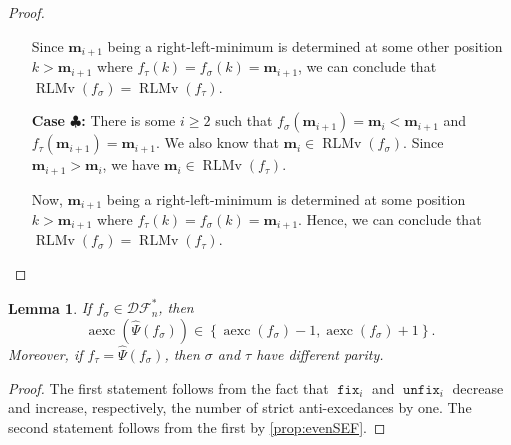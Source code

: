 \documentclass[reqno]{amsart}
\newtheorem{lemma}[theorem]{Lemma}
\theoremstyle{definition}
\newcommand{\DSEF}{\mathcal{DF}}%
\newcommand{\fretherD}{\hat{\Psi}}
\newcommand{\caseFour}{\ensuremath{\clubsuit}}
\newcommand{\img}{\mathbf{m}}
\DeclareMathOperator{\RLMv}{RLMv}
\DeclareMathOperator{\aexc}{aexc} %
\DeclareMathOperator{\fixMap}{\mathtt{fix}}
\DeclareMathOperator{\unfixMap}{\mathtt{unfix}}
\begin{document}
\begin{proof}
\begin{enumerate}[leftmargin=2cm]
	Since $\img_{i+1}$ being a right-left-minimum is determined at some other
	position $k>\img_{i+1}$ where $f_\tau(k)=f_\sigma(k)=\img_{i+1}$,
	we can conclude that $\RLMv(f_\sigma)=\RLMv(f_\tau)$.
	
	\item[\textbf{Case \caseFour:}]
	There is some $i\geq 2$ such that $f_\sigma(\img_{i+1})=\img_i<\img_{i+1}$
	and $f_\tau(\img_{i+1})=\img_{i+1}$.
	We also know that $\img_i\in\RLMv(f_\sigma)$. 
	Since $\img_{i+1}>\img_i$, we have $\img_i\in\RLMv(f_\tau)$.
	
	Now, $\img_{i+1}$ being a right-left-minimum
	is determined at some position $k>\img_{i+1}$ where 
	$f_\tau(k)=f_\sigma(k)=\img_{i+1}$.
	Hence, we can conclude that $\RLMv(f_\sigma)=\RLMv(f_\tau)$.
	\end{enumerate}
\end{proof}


\begin{lemma}\label{lem:signReversing}
If $f_{\sigma}\in \DSEF^*_n$, then 
\[
 \aexc(\fretherD(f_{\sigma})) \in \left\{ \aexc(f_{\sigma})-1, \aexc(f_{\sigma})+1 \right\}.
\]
Moreover, if $f_\tau = \fretherD(f_{\sigma})$,
then $\sigma$ and $\tau$ have different parity.
\end{lemma}
\begin{proof}
The first statement follows from the fact that $\fixMap_i$
and $\unfixMap_i$ decrease and increase, respectively, 
the number of strict anti-excedances by one.
The second statement follows from the first by \cref{prop:evenSEF}.
\end{proof}
\end{document}
